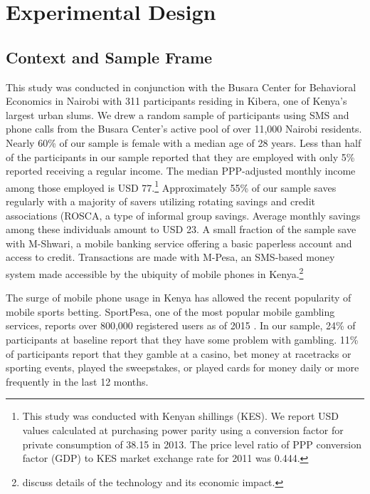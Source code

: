 \documentclass[12pt]{article}
\begin{document}
\section{Experimental Design} \label{sec:design}

	\subsection{Context and Sample Frame}

		This study was conducted in conjunction with the Busara Center for Behavioral Economics in Nairobi with 311 participants residing in Kibera, one of Kenya's largest urban slums. We drew a random sample of participants using SMS and phone calls from the Busara Center's active pool of over 11,000 Nairobi residents. Nearly 60\% of our sample is female with a median age of 28 years. Less than half of the participants in our sample reported that they are employed with only 5\% reported receiving a regular income. The median PPP-adjusted monthly income among those employed is USD 77.\footnote{This study was conducted with Kenyan shillings (KES). We report USD values calculated at purchasing power parity using a conversion factor for private consumption of 38.15 in 2013. The price level ratio of PPP conversion factor (GDP) to KES market exchange rate for 2011 was 0.444.} Approximately 55\% of our sample saves regularly with a majority of savers utilizing rotating savings and credit associations (ROSCA, a type of informal group savings. Average monthly savings among these individuals amount to USD 23. A small fraction of the sample save with M-Shwari, a mobile banking service offering a basic paperless account and access to credit. Transactions are made with M-Pesa, an SMS-based money system made accessible by the ubiquity of mobile phones in Kenya.\footnote{ discuss details of the technology and its economic impact.}

		The surge of mobile phone usage in Kenya has allowed the recent popularity of mobile sports betting. SportPesa, one of the most popular mobile gambling services, reports over 800,000 registered users as of 2015 . In our sample, 24\% of participants at baseline report that they have some problem with gambling. 11\% of participants report that they gamble at a casino, bet money at racetracks or sporting events, played the sweepstakes, or played cards for money daily or more frequently in the last 12 months.

\end{document}
